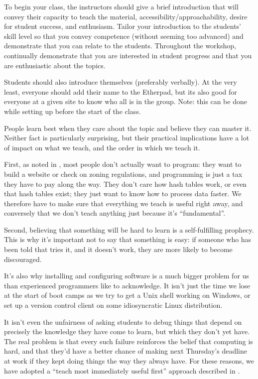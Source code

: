 
To begin your class, the instructors should give a brief introduction
that will convey their capacity to teach the material,
accessibility/approachability, desire for student success, and
enthusiasm. Tailor your introduction to the students' skill level so
that you convey competence (without seeming too advanced) and
demonstrate that you can relate to the students. Throughout the
workshop, continually demonstrate that you are interested in student
progress and that you are enthusiastic about the topics.

Students should also introduce themselves (preferably verbally). At the
very least, everyone should add their name to the Etherpad, but its also
good for everyone at a given site to know who all is in the group. Note:
this can be done while setting up before the start of the class.


People learn best when they care about the topic and believe they can
master it. Neither fact is particularly surprising, but their
practical implications have a lot of impact on what we teach, and the
order in which we teach it.

First, as noted in , most people don't
actually want to program: they want to build a website or check on
zoning regulations, and programming is just a tax they have to pay
along the way. They don't care how hash tables work, or even that hash
tables exist; they just want to know how to process data faster. We
therefore have to make sure that everything we teach is useful right
away, and conversely that we don't teach anything just because it's
``fundamental''.

Second, believing that something will be hard to learn is a
self-fulfilling prophecy. This is why it's important not to say that
something is easy: if someone who has been told that tries it, and it
doesn't work, they are more likely to become discouraged.

It's also why installing and configuring software is a much bigger
problem for us than experienced programmers like to acknowledge. It
isn't just the time we lose at the start of boot camps as we try to
get a Unix shell working on Windows, or set up a version control
client on some idiosyncratic Linux distribution.

It isn't even the unfairness of asking students to debug things that
depend on precisely the knowledge they have come to learn, but which
they don't yet have. The real problem is that every such failure
reinforces the belief that computing is hard, and that they'd have a
better chance of making next Thursday's deadline at work if they kept
doing things the way they always have. For these reasons, we have
adopted a ``teach most immediately useful first'' approach described
in .

